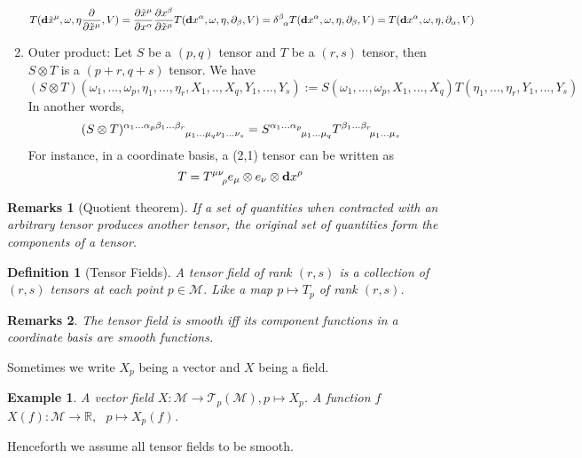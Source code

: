 \documentclass[a4paper]{article}
\newtheorem{eg}{Example}[section]
\newtheorem{remarks}{Remarks}[section]
\theoremstyle{new}
\newtheorem{defi}{Definition}[section]
\begin{document}
\begin{enumerate}
    $$T(\mathbf{d}\tilde{x}^\mu,\omega,\eta\frac{\partial}{\partial\tilde{x}^\mu},V)=\frac{\partial\tilde{x}^\mu}{\partial x^\alpha}\frac{\partial x^\beta}{\partial\tilde{x}^\mu}T(\mathbf{d}x^\alpha,\omega,\eta,\partial_\beta,V)=\tensor*{\delta}{*_{}^{\beta}_{\alpha}}T(\mathbf{d}x^\alpha,\omega,\eta,\partial_\beta,V)=T(\mathbf{d}x^\alpha,\omega,\eta,\partial_\alpha,V)$$
    \item Outer product: Let $S$ be a $(p,q)$ tensor and $T$ be a $(r,s)$ tensor, then $S\otimes T$ is a $(p+r,q+s)$ tensor. We have
    $$(S\otimes T)(\omega_1,...,\omega_p,\eta_1,...,\eta_r,X_1,..,X_q,Y_1,...,Y_s):=S(\omega_1,...,\omega_p,X_1,...,X_q)T(\eta_1,...,\eta_r,Y_1,...,Y_s)$$
    In another words,
    $$\tensor*{(S\otimes T)}{*_{}^{\alpha_1...\alpha_p\beta_1...\beta_r}_{\mu_1...\mu_q\nu_1...\nu_s}}=\tensor*{S}{*_{}^{\alpha_1...\alpha_p}_{\mu_1...\mu_q}}\tensor*{T}{*_{}^{\beta_1...\beta_r}_{\mu_1...\mu_s}}$$
    For instance, in  a coordinate basis, a (2,1) tensor can be written as
        $$T=\tensor*{T}{*_{}^{\mu\nu}_{\rho}}e_\mu\otimes e_\nu\otimes\mathbf{d}x^\rho$$
\end{enumerate}
\begin{remarks}[Quotient theorem]
If a set of quantities when contracted with an arbitrary tensor produces another tensor, the original set of quantities form the components of a tensor.
\end{remarks}
\begin{defi}[Tensor Fields]
A tensor field of rank $(r,s)$ is a collection of $(r,s)$ tensors at each point $p\in\mathcal{M}$. Like a map $p\mapsto T_p$ of rank $(r,s)$.
\end{defi}
\begin{remarks}
The tensor field is smooth iff its component functions in a coordinate basis are smooth functions.
\end{remarks}
Sometimes we write $X_p$ being a vector and $X$ being a field.
\begin{eg}
A vector field $X:\mathcal{M}\rightarrow\mathcal{T}_p(\mathcal{M}),p\mapsto X_p$. A function $f$ $X(f):\mathcal{M}\rightarrow\mathbb{R},\text{  }p\mapsto X_p(f)$.
\end{eg}
Henceforth we assume all tensor fields to be smooth.
\end{document}
